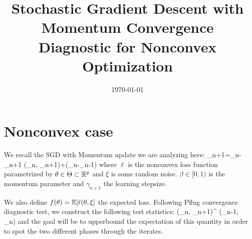 \documentclass[11pt]{article}
\theoremstyle{k}
\begin{document}
\title{Stochastic Gradient Descent with Momentum Convergence Diagnostic for Nonconvex Optimization}
\date{\today}

\maketitle


\section{Nonconvex case}
We recall the SGD with Momentum update we are analyzing here:
\beq
\theta_{n+1}=\theta_{n}-\gamma_{n+1} \nabla \ell\left(\theta_{n}, \xi_{n+1}\right)+\beta\left(\theta_{n}-\theta_{n-1}\right)
\eeq
where $\ell$ is the nonconvex loss function parametrized by $\theta \in \Theta \subset \rset^p$ and $\xi$ is some random noise. $\beta \in [0,1)$ is the momentum parameter and $\gamma_{n+1}$ the learning stepsize.

We also define $f(\theta) = \EE[\ell(\theta, \xi]$ the expected loss. 
Following Pflug convergence diagnostic test, we construct the following test statistics:
\beq \label{eq:test}
\nabla \ell\left(\theta_{n}, \xi_{n+1}\right)^{\top} \nabla \ell\left(\theta_{n-1}, \xi_{n}\right)
\eeq
and the goal will be to upperbound the expectation of this quantity in order to spot the two different phases through the iterates.
\end{document}
